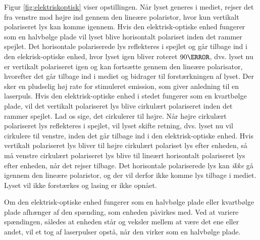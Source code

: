 Figur \ref{fig:elektriskoptisk} viser opstillingen. Når lyset generes i mediet, rejser det fra venstre mod højre ind gennem den lineære polaristor, hvor kun vertikalt polariseret lys kan komme igennem. Hvis den elektrisk-optiske enhed fungerer som en halvbølge plade vil lyset blive horisontalt polariset inden det rammer spejlet. Det horisontale polariserede lys reflekteres i spejlet og går tilbage ind i den elekrisk-optiske enhed, hvor lyset igen bliver roteret $90\degree$, dvs. lyset nu er vertikalt polariseret igen og kan fortsætte gennem den lineære polarisator, hvorefter det går tilbage ind i mediet og bidrager til forstærkningen af lyset. Der sker en pludselig høj rate for stimuleret emission, som giver anledning til en laserpuls. 
Hvis den elektrisk-optiske enhed i stedet fungerer som en kvartbølge plade, vil det vertikalt polariseret lys blive cirkulært polariseret inden det rammer spejlet. Lad os sige, det cirkulerer til højre. Når højre cirkulært polariseret lys reflekteres i spejlet, vil lyset skifte retning, dvs. lyset nu vil cirkulere til venstre, inden det går tilbage ind i den elektrisk-optiske enhed. Hvis vertikalt polariseret lys bliver til højre cirkulært polariset lys efter enheden, så må venstre cirkulært polariseret lys blive til lineært horisontalt polariseret lys efter enheden, når det rejser tilbage. Det horisontale polariserede lys kan \emph{ikke} gå igennem den lineære polaristor, og der vil derfor ikke komme lys tilbage i mediet. Lyset vil ikke forstærkes og lasing er ikke opnået. 

Om den elektrisk-optiske enhed fungerer som en halvbølge plade eller kvartbølge plade afhænger af den spænding, som enheden påvirkes med. Ved at variere spændingen, således at enheden står og veksler mellem at være det ene eller andet, vil et tog af laserpulser opstå, når den virker som en halvbølge plade. 


